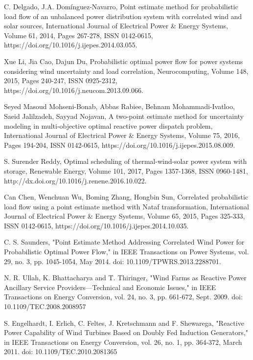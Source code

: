 \begin{thebibliography}{99}
\begin{singlespace}
 C. Delgado, J.A. Domínguez-Navarro, Point estimate method for probabilistic load flow of an unbalanced power distribution system with correlated wind and solar sources, International Journal of Electrical Power \& Energy Systems, Volume 61, 2014, Pages 267-278, ISSN 0142-0615, https://doi.org/10.1016/j.ijepes.2014.03.055.

 Xue Li, Jia Cao, Dajun Du, Probabilistic optimal power flow for power systems considering wind uncertainty and load correlation, Neurocomputing, Volume 148, 2015, Pages 240-247,
ISSN 0925-2312, https://doi.org/10.1016/j.neucom.2013.09.066.

 Seyed Masoud Mohseni-Bonab, Abbas Rabiee, Behnam Mohammadi-Ivatloo, Saeid Jalilzadeh, Sayyad Nojavan, A two-point estimate method for uncertainty modeling in multi-objective optimal reactive power dispatch problem, International Journal of Electrical Power \& Energy Systems, Volume 75, 2016, Pages 194-204, ISSN 0142-0615, https://doi.org/10.1016/j.ijepes.2015.08.009.

S. Surender Reddy, Optimal scheduling of thermal-wind-solar power system with storage, Renewable Energy, Volume 101, 2017, Pages 1357-1368, ISSN 0960-1481, http://dx.doi.org/10.1016/j.renene.2016.10.022.


 Can Chen, Wenchuan Wu, Boming Zhang, Hongbin Sun, Correlated probabilistic load flow using a point estimate method with Nataf transformation, International Journal of Electrical Power \& Energy Systems, Volume 65, 2015, Pages 325-333, ISSN 0142-0615, https://doi.org/10.1016/j.ijepes.2014.10.035.

 C. S. Saunders, "Point Estimate Method Addressing Correlated Wind Power for Probabilistic Optimal Power Flow," in IEEE Transactions on Power Systems, vol. 29, no. 3, pp. 1045-1054, May 2014. doi: 10.1109/TPWRS.2013.2288701.

 N. R. Ullah, K. Bhattacharya and T. Thiringer, "Wind Farms as Reactive Power Ancillary Service Providers—Technical and Economic Issues," in IEEE Transactions on Energy Conversion, vol. 24, no. 3, pp. 661-672, Sept. 2009. doi: 10.1109/TEC.2008.2008957

 S. Engelhardt, I. Erlich, C. Feltes, J. Kretschmann and F. Shewarega, "Reactive Power Capability of Wind Turbines Based on Doubly Fed Induction Generators," in IEEE Transactions on Energy Conversion, vol. 26, no. 1, pp. 364-372, March 2011. doi: 10.1109/TEC.2010.2081365


\end{singlespace}
\end{thebibliography}
